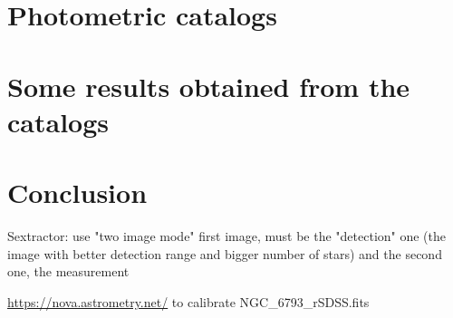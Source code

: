 \documentclass{aa}
\begin{document}
    \section{Photometric catalogs}\label{sec: Photometric catalogs}
    \section{Some results obtained from the catalogs}\label{sec: Results}
    \section{Conclusion}\label{sec: Conclusion}
    
   Sextractor: use "two image mode" first image, must be the "detection" one (the image with better detection range and bigger number of stars) and the second one, the measurement

  \url{ https://nova.astrometry.net/} to calibrate NGC\_6793\_rSDSS.fits

%
\nocite{*}


\end{document}
